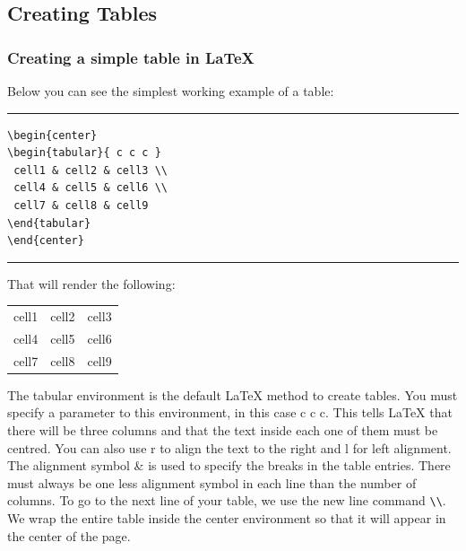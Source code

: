 \documentclass[12pt]{article}
\begin{document}
\subsection{Creating Tables}



\subsubsection{Creating a simple table in \LaTeX{}}

\begin{minipage}{\linewidth}
Below you can see the simplest working example of a table:\bigskip
\hrule
\begin{lstlisting}
\begin{center}
\begin{tabular}{ c c c }
 cell1 & cell2 & cell3 \\ 
 cell4 & cell5 & cell6 \\  
 cell7 & cell8 & cell9
\end{tabular}
\end{center}
\end{lstlisting}
\hrule
\end{minipage}\bigskip

\begin{minipage}{\linewidth}
That will render the following:\bigskip
\begin{center}
\begin{tabular}{ c c c }
 cell1 & cell2 & cell3 \\ 
 cell4 & cell5 & cell6 \\  
 cell7 & cell8 & cell9
\end{tabular}
\end{center}
\end{minipage}\bigskip

\begin{minipage}{\linewidth}
The tabular environment is the default LaTeX method to create tables. You must specify a parameter to this environment, in this case {c c c}. This tells LaTeX that there will be three columns and that the text inside each one of them must be centred. You can also use r to align the text to the right and l for left alignment. The alignment symbol \& is used to specify the breaks in the table entries. There must always be one less alignment symbol in each line than the number of columns. To go to the next line of your table, we use the new line command \verb+\\+. We wrap the entire table inside the center environment so that it will appear in the center of the page. 
\end{minipage}
\end{document}
